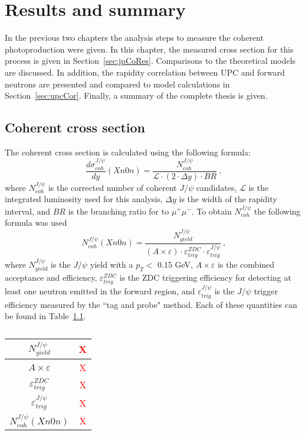 \chapter{Results and summary}
  In the previous two chapters the analysis steps to measure the coherent
    \JPsi{} photoproduction were given.
  In this chapter, the measured cross section for this process is given
    in Section~\ref{sec:jpCoRes}.
  Comparisons to the theoretical models are discussed. 
  In addition, the rapidity correlation between UPC \JPsi{} and forward
    neutrons are presented and compared to model calculations in 
    Section~\ref{sec:upcCor}. 
  Finally, a summary of the complete thesis is given.  
  
  \section{Coherent \JPsi{} cross section\label{sec:jpCoRes}}
%
 The coherent \JPsi{} cross section is calculated using the following formula:
%
\begin{equation}
\frac{d\sigma^{J/\psi}_{coh}}{dy} (Xn0n)= \frac{N^{J/\psi}_{coh}}{\mathcal{L} \cdot (2 \cdot \Delta y )\cdot BR}~\textrm{,}
\label{eq:expXSecCo}
\end{equation}
%
where $N^{J/\psi}_{coh}$ is the corrected number of coherent $J/\psi$ candidates,  $\mathcal{L}$ is the integrated luminosity used for
this analysis, $\Delta y$ is the width of the rapidity interval, and $BR$ is the branching ratio for \JPsi{} to $\mu^{+}\mu^{-}$. To obtain $N^{J/\psi}_{coh}$ the following
formula was used  
%
\begin{equation}
N^{J/\psi}_{coh}(Xn0n) = \frac{N^{J/\psi}_{yield}}{(A\times \varepsilon) \cdot \varepsilon^{ZDC}_{trig} \cdot \varepsilon^{J/\psi}_{trig}}~\textrm{,}
\end{equation}
%
where $N^{J/\psi}_{yield}$ is the $J/\psi$ yield with a $p_{T} <$ 0.15 GeV, $A\times \varepsilon$ is the combined acceptance and efficiency, $\varepsilon^{ZDC}_{trig}$ is the ZDC triggering efficiency for detecting at least one neutron emitted in the forward region, and $\varepsilon^{J/\psi}_{trig}$ is the $J/\psi$ trigger efficiency measured by the ``tag and probe" method. Each of these quantities can be found in Table~\ref{tab:nJpCoh}.
%
\begin{table}
  \centering
  \begin{tabular}{|c|c|} \hline 
    $N^{J/\psi}_{yield}$ & \textcolor{red}{X} \\ \hline  
    $A\times \varepsilon$ & \textcolor{red}{X} \\ \hline
    $\varepsilon^{ZDC}_{trig}$ & \textcolor{red}{X} \\ \hline
    $\varepsilon^{J/\psi}_{trig}$ & \textcolor{red}{X} \\ \hline \hline 
    $N^{J/\psi{}}_{coh} (Xn0n)$ & \textcolor{red}{X} \\ \hline 
  \end{tabular}
  \caption{\label{tab:nJpCoh}}
\end{table}  

